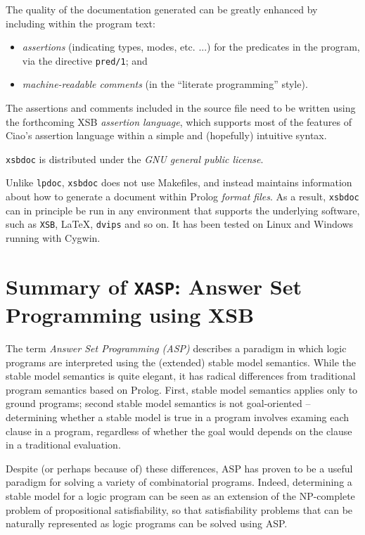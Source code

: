 The quality of the documentation generated can be greatly enhanced by
including within the program text:

\begin{itemize}

\item {\em assertions} (indicating types, modes, etc. ...) for the
predicates in the program, via the directive {\tt pred/1}; and

\item {\em machine-readable comments} (in the ``literate programming''
style).

\end{itemize}

The assertions and comments included in the source file need to be
written using the forthcoming XSB {\em assertion language}, which
supports most of the features of Ciao's assertion language within a
simple and (hopefully) intuitive syntax.

{\tt xsbdoc} is distributed under the {\em GNU general public
license}.

Unlike {\tt lpdoc}, {\tt xsbdoc} does not use Makefiles, and instead
maintains information about how to generate a document within Prolog
{\em format files}.  As a result, {\tt xsbdoc} can in principle be run
in any environment that supports the underlying software, such as
{\tt XSB}, \LaTeX, {\tt dvips} and so on.  It has been tested on
Linux and Windows running with Cygwin.


\section{Summary of {\tt XASP}: Answer Set Programming using XSB}
\label{package:xsm} 

The term {\em Answer Set Programming (ASP)} describes a paradigm in
which logic programs are interpreted using the (extended) stable model
semantics.  While the stable model semantics is quite elegant, it has
radical differences from traditional program semantics based on
Prolog.  First, stable model semantics applies only to ground
programs; second stable model semantics is not goal-oriented --
determining whether a stable model is true in a program involves
examing each clause in a program, regardless of whether the goal would
depends on the clause in a traditional evaluation.

Despite (or perhaps because of) these differences, ASP has proven to
be a useful paradigm for solving a variety of combinatorial programs.
Indeed, determining a stable model for a logic program can be seen as
an extension of the NP-complete problem of propositional
satisfiability, so that satisfiability problems that can be naturally
represented as logic programs can be solved using ASP.  

